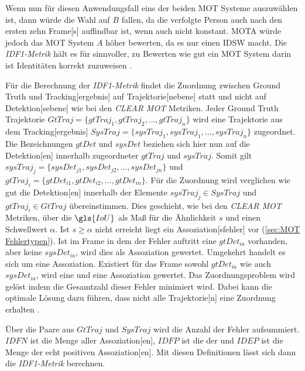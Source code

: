 Wenn nun für diesen Anwendungsfall eins der beiden \gls{MOT} Systeme auszuwählen ist, dann würde die Wahl auf \(B\) fallen, da die verfolgte Person auch nach den ersten zehn \gls{Frame}[s] auffindbar ist, wenn auch nicht konstant. \gls{MOTA} würde jedoch das \gls{MOT} System \(A\) höher bewerten, da es nur einen \gls{IDSW} macht. Die \textit{\gls{IDF1}-Metrik} hält es für sinnvoller, zu Bewerten wie gut ein \gls{MOT} System darin ist Identitäten korrekt zuzuweisen \cite{IDF1}. \par

Für die Berechnung der \textit{\gls{IDF1}-Metrik} findet die Zuordnung zwischen \gls{Ground Truth} und \gls{Tracking}[ergebnis] auf \gls{Trajektorie}[nebene] statt und nicht auf \gls{Detektion}[sebene] wie bei den \textit{\acrshort{CLEAR} \gls{MOT}} Metriken. Jeder \gls{Ground Truth} \gls{Trajektorie} \(GtTraj = \{gtTraj_1, gtTraj_2, \dots, gtTraj_n\}\) wird eine \gls{Trajektorie} aus dem \gls{Tracking}[ergebnis] \(SysTraj = \{sysTraj_1, sysTraj_1, \dots, sysTraj_n\}\) zugeordnet. Die Bezeichnungen \(gtDet\) und \(sysDet\) beziehen sich hier nun auf die \gls{Detektion}[en] innerhalb zugeordneter \(gtTraj\) und \(sysTraj\). Somit gilt \(sysTraj_j = \{sysDet_{j1}, sysDet_{j2}, \dots, sysDet_{jn}\}\) und \(gtTraj_i = \{gtDet_{i1}, gtDet_{i2}, \dots, gtDet_{in}\}\). Für die Zuordnung wird verglichen wie gut die \gls{Detektion}[en] innerhalb der Elemente \(sysTraj_j \in SysTraj\) und \(gtTraj_i \in GtTraj\) übereinstimmen. Dies geschieht, wie bei den \textit{\acrshort{CLEAR} \gls{MOT}} Metriken, über die \(\gls{IoU}\) als Maß für die Ähnlichkeit \(s\) und einen Schwellwert \(\alpha\). Ist \(s \geq \alpha\) nicht erreicht liegt ein \gls{Assoziation}[sfehler] vor (\ref{sec:MOT Fehlertypen}). Ist im \gls{Frame} in dem der Fehler auftritt eine \(gtDet_{ia}\) vorhanden, aber keine \(sysDet_{ia}\), wird dies als  \gls{Assoziation} gewertet. Umgekehrt handelt es sich um eine  \gls{Assoziation}. Existiert für das \gls{Frame} sowohl \(gtDet_{ia}\) wie auch \(sysDet_{ia}\), wird eine  und eine  \gls{Assoziation} gewertet. Das Zuordnungsproblem wird gelöst indem die Gesamtzahl dieser Fehler minimiert wird. Dabei kann die optimale Lösung dazu führen, dass nicht alle \gls{Trajektorie}[n] eine Zuordnung erhalten \cite{IDF1}. \par

Über die Paare aus \(GtTraj\) und \(SysTraj\) wird die Anzahl der Fehler aufsummiert. \(IDFN\) ist die Menge aller  \gls{Assoziation}[en], \(IDFP\) ist die der  und \(IDEP\) ist die Menge der echt positiven \gls{Assoziation}[en]. Mit diesen Definitionen lässt sich dann die \textit{\gls{IDF1}-Metrik} berechnen. 

